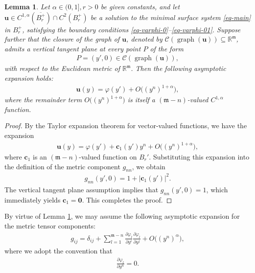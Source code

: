 \documentclass[11pt,reqno]{amsart}
\newcommand{\fm}{\mathfrak{m}}
\newtheorem{lemma}[theorem]{Lemma}
\theoremstyle{definition}
\numberwithin{equation}{section}
\begin{document}
\begin{lemma}\label{lem-c1=0}
    Let $\alpha \in (0,1], r>0$ be given constants, and let $\mathbf{u} \in C^{1,\alpha}(\overline{B^+_r}) \cap C^2(B^+_r)$ be a solution to the minimal surface system \eqref{eq-main} in $B^+_r$, satisfying the boundary conditions \eqref{eq-varphi-0}--\eqref{eq-varphi-01}. Suppose further that the closure of the graph of $\mathbf{u}$, denoted by $\mathcal{C}(\operatorname{graph}(\mathbf{u}))\subseteq \mathbb R^\fm$, admits a vertical tangent plane at every point $P$ of the form
    \begin{align}
    P=(y', 0) \in \mathcal{C}(\operatorname{graph}(\mathbf{u})),
    \end{align}
    with respect to the Euclidean metric of $\mathbb{R}^\fm$. Then the following asymptotic expansion holds:
    \begin{align}
        \mathbf{u}(y)= \varphi(y') + O\bigl((y^n)^{1+\alpha}\bigr),
    \end{align}
    where the remainder term $O\bigl((y^n)^{1+\alpha}\bigr)$ is itself a $(\fm-n)$-valued $C^{1,\alpha}$ function.
\end{lemma}

\begin{proof}
    By the Taylor expansion theorem for vector-valued functions, we have the expansion
    \begin{align}
        \mathbf{u}(y) = \varphi(y') + \mathbf{c}_1 (y')y^n + O\bigl((y^n)^{1+\alpha}\bigr),
    \end{align}
    where $\mathbf{c}_1$ is an $(\fm-n)$-valued function on $B_r'$. Substituting this expansion into the definition of the metric component $g_{nn}$, we obtain
    \begin{align}
        g_{nn}(y', 0) = 1 + \bigl|\mathbf{c}_1(y')\bigr|^2.
    \end{align}
    The vertical tangent plane assumption implies that $g_{nn}(y', 0)=1$, which immediately yields $\mathbf{c}_1=\mathbf{0}$. This completes the proof.
\end{proof}

By virtue of Lemma \ref{lem-c1=0}, we may assume the following asymptotic expansion for the metric tensor components:
\begin{align}
    g_{ij} = \delta_{ij} +\sum_{l=1}^{\fm -n} \frac{\partial \varphi_l}{\partial y^i}\frac{\partial \varphi_l}{\partial y^j} +O\bigl((y^n)^\alpha\bigr),
\end{align}
where we adopt the convention that
\begin{align}
    \frac{\partial \varphi_l}{\partial y^n} = 0.
\end{align}
\end{document}
